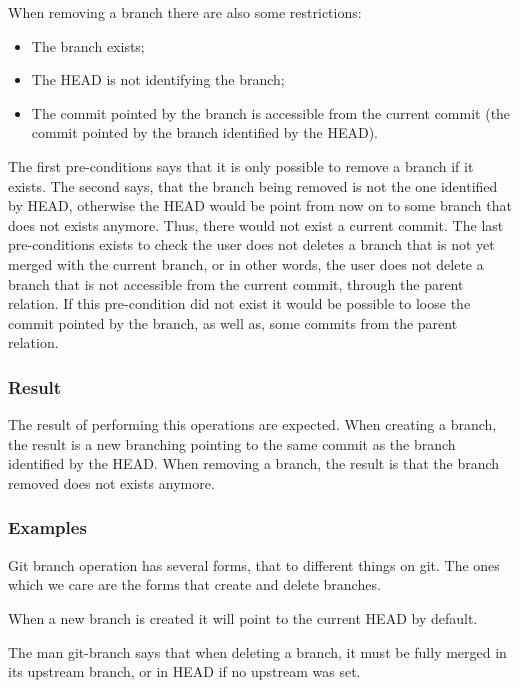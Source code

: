 When removing a branch there are also some restrictions:
\begin{itemize}
   \item The branch exists;
   \item The HEAD is not identifying the branch;
   \item The commit pointed by the branch is accessible from the
   current commit (the commit pointed by the branch identified by the
   HEAD).
\end{itemize}

The first pre-conditions says that it is only possible to remove a
branch if it exists. The second says, that the branch being removed is
not the one identified by HEAD, otherwise the HEAD would be point from
now on to some branch that does not exists anymore. Thus, there would
not exist a current commit. The last pre-conditions exists to check
the user does not deletes a branch that is not yet merged with the
current branch, or in other words, the user does not delete a branch
that is not accessible from the current commit, through the parent relation. 
If this pre-condition did not exist it would be possible to loose the
commit pointed by the branch, as well as, some commits from the parent
relation.


\subsubsection{Result}
The result of performing this operations are expected. When creating a
branch, the result is a new branching pointing to the same commit as
the branch identified by the HEAD. When removing a branch, the result
is that the branch removed does not exists anymore.

\subsubsection{Examples}
Git branch operation has several forms, that to different things on git.
The ones which we care are the forms that create and delete branches. \par
When a new branch is created it will point to the current HEAD by default.
\par


The man git-branch says that when deleting a branch, it must be fully
merged in its upstream branch, or in HEAD if no upstream was set. \par


